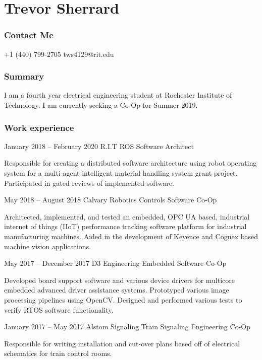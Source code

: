 \documentclass{tccv}
\begin{document}
\part{Trevor Sherrard}
\section{Contact Me}
\begin{eventlist}
    {+1 (440) 799-2705}
    {tws4129@rit.edu}
    
\end{eventlist}

\section{Summary}
I am a fourth year electrical engineering student at Rochester Institute of Technology. I am currently seeking a Co-Op for Summer 2019.

\section{Work experience}

\begin{eventlist}

\item{January 2018 -- February 2020}
     {R.I.T}
     {ROS Software Architect}

Responsible for creating a distributed software architecture using robot operating system for a multi-agent intelligent material handling system grant project. Participated in gated reviews of implemented software.

\item{May 2018 -- August 2018}
     {Calvary Robotics}
     {Controls Software Co-Op}

Architected, implemented, and tested an embedded, OPC UA based, industrial internet of things (IIoT) performance tracking software platform for industrial manufacturing machines. Aided in the development of Keyence and Cognex based machine vision applications.

\item{May 2017 -- December 2017}
     {D3 Engineering}
     {Embedded Software Co-Op}
     
Developed board support software and various device drivers for multicore embedded advanced driver assistance systems. Prototyped various image processing pipelines using OpenCV. Designed and performed various tests to verify RTOS software functionality.

\item{January 2017 -- May 2017}
     {Alstom Signaling}
     {Train Signaling Engineering Co-Op}

Responsible for writing installation and cut-over plans based off of electrical schematics for train control rooms.

\end{eventlist}
\end{document}

